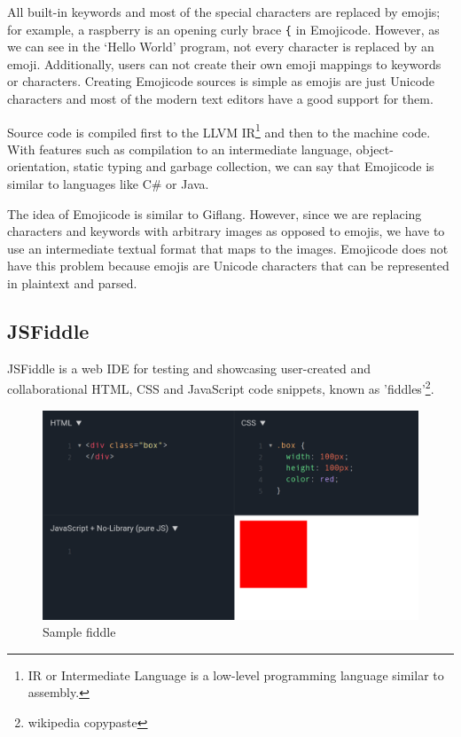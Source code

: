 All built-in keywords and most of the special characters are replaced by emojis; for example, a raspberry is an opening curly brace \texttt{\{} in Emojicode.
However, as we can see in the `Hello World' program, not every character is replaced by an emoji. Additionally, users can not create their own emoji
mappings to keywords or characters. Creating Emojicode sources is simple as emojis are just Unicode characters and most of the modern text editors
have a good support for them.

Source code is compiled first to the LLVM IR\footnote{IR or Intermediate Language is a low-level programming language similar to assembly.} and then to
the machine code. With features such as compilation to an intermediate language, object-orientation, static typing and garbage collection, we can
say that Emojicode is similar to languages like C\# or Java.

The idea of Emojicode is similar to Giflang. However, since we are replacing characters and keywords with arbitrary images as
opposed to emojis, we have to use an intermediate textual format that maps to the images. Emojicode does not have this problem because emojis are
Unicode characters that can be represented in plaintext and parsed.

\subsection{JSFiddle}
JSFiddle \cite{JSFiddle} is a web IDE for testing and showcasing user-created and collaborational HTML, CSS and JavaScript code snippets, known as
'fiddles'\footnote{wikipedia copypaste}.

\begin{figure}[!hbt]
    \centering
	\includegraphics[width=\textwidth]{../img/jsfiddle}
	\caption{Sample fiddle}
	\label{fig:chap1:jsfiddle}
\end{figure}

